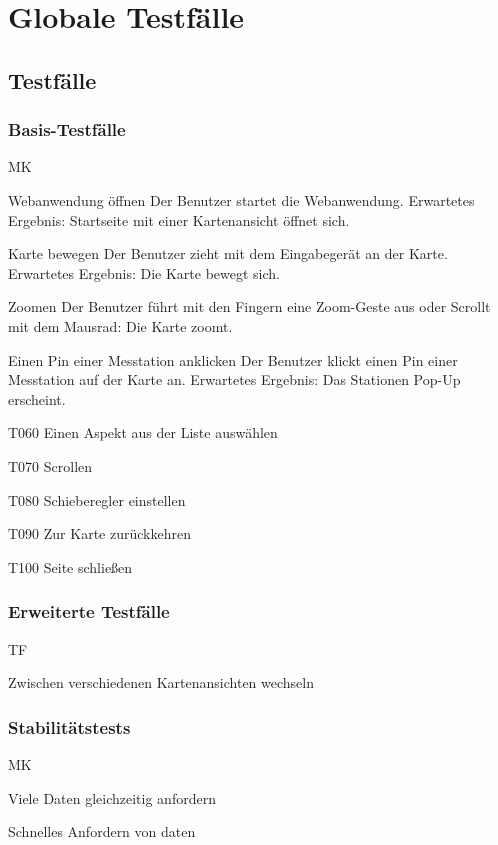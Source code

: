 \section{Globale Testfälle}
\subsection{Testfälle}
\setcounter{counter}{10}
\subsubsection{Basis-Testfälle}
\begin{Kriterien}{MK}

	\item[Webanwendung öffnen] Der Benutzer startet die \gls{Webanwendung}. Erwartetes Ergebnis: Startseite mit einer Kartenansicht öffnet sich.

	\item[Karte bewegen] Der Benutzer zieht mit dem Eingabegerät an der Karte. Erwartetes Ergebnis: Die Karte bewegt sich.
	
	\item[Zoomen] Der Benutzer führt mit den Fingern eine Zoom-Geste aus oder Scrollt mit dem Mausrad: Die Karte zoomt.
	
	\item[Einen Pin einer Messtation anklicken] Der Benutzer klickt einen Pin einer Messtation auf der Karte an. Erwartetes Ergebnis: Das Stationen Pop-Up erscheint.
	
	\item[T060] Einen Aspekt aus der Liste auswählen
	
	\item[T070] Scrollen
	
	\item[T080] Schieberegler einstellen
	
	\item[T090] Zur Karte zurückkehren
	
	\item[T100] Seite schließen
\end{Kriterien}
\subsubsection{Erweiterte Testfälle}
\begin{Kriterien}{TF}
	
	\item Zwischen verschiedenen Kartenansichten wechseln
	
\end{Kriterien}
\subsubsection{Stabilitätstests}
\begin{Kriterien}{MK}

	\item Viele Daten gleichzeitig anfordern

	\item Schnelles Anfordern von daten
	
\end{Kriterien}
